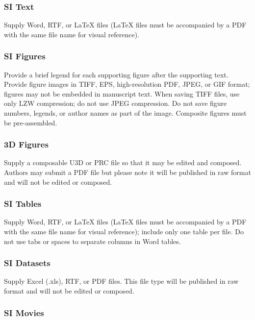 \documentclass[9pt,twocolumn,twoside,lineno]{pnas-new}
\begin{document}
\subsubsection*{SI Text}

Supply Word, RTF, or LaTeX files (LaTeX files must be accompanied by a PDF with the same file name for visual reference).

\subsubsection*{SI Figures}

Provide a brief legend for each supporting figure after the supporting text. Provide figure images in TIFF, EPS, high-resolution PDF, JPEG, or GIF format; figures may not be embedded in manuscript text. When saving TIFF files, use only LZW compression; do not use JPEG compression. Do not save figure numbers, legends, or author names as part of the image. Composite figures must be pre-assembled.

\subsubsection*{3D Figures}

Supply a composable U3D or PRC file so that it may be edited and composed. Authors may submit a PDF file but please note it will be published in raw format and will not be edited or composed.

\subsubsection*{SI Tables}

Supply Word, RTF, or LaTeX files (LaTeX files must be accompanied by a PDF with the same file name for visual reference); include only one table per file. Do not use tabs or spaces to separate columns in Word tables.

\subsubsection*{SI Datasets}

Supply Excel (.xls), RTF, or PDF files. This file type will be published in raw format and will not be edited or composed.

\subsubsection*{SI Movies}
\end{document}
